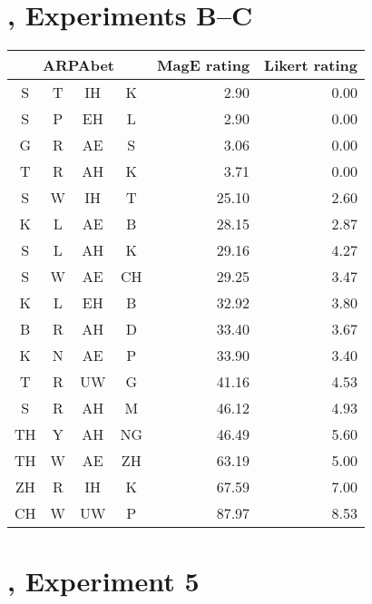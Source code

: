 \section{\citet{Greenberg1964}, Experiments B--C}

\begin{center}
\begin{longtable}{c@{ } c@{ } c@{ } c r r}
\toprule
\multicolumn{4}{c}{ARPAbet} & MagE rating & Likert rating \\ 
\midrule 
S  & T & IH & K  & 2.90   & 0.00 \\
S  & P & EH & L  & 2.90   & 0.00 \\
G  & R & AE & S  & 3.06   & 0.00 \\
T  & R & AH & K  & 3.71   & 0.00 \\
S  & W & IH & T  & 25.10  & 2.60 \\
K  & L & AE & B  & 28.15  & 2.87 \\
S  & L & AH & K  & 29.16  & 4.27 \\
S  & W & AE & CH & 29.25  & 3.47 \\
K  & L & EH & B  & 32.92  & 3.80 \\
B  & R & AH & D  & 33.40  & 3.67 \\
K  & N & AE & P  & 33.90  & 3.40 \\
T  & R & UW & G  & 41.16  & 4.53 \\
S  & R & AH & M  & 46.12  & 4.93 \\
TH & Y & AH & NG & 46.49  & 5.60 \\
TH & W & AE & ZH & 63.19  & 5.00 \\
ZH & R & IH & K  & 67.59  & 7.00 \\
CH & W & UW & P  & 87.97  & 8.53 \\
\bottomrule
\end{longtable}
\end{center}

\section{\citet{Scholes1966}, Experiment 5}


